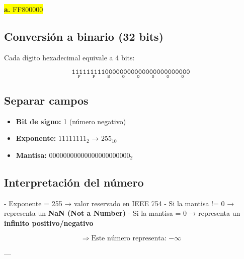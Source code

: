 \documentclass[a4paper,12pt]{article}
\begin{document}
	
	\vspace{1em}
	\begin{center}
	\colorbox{yellow}{\textbf{a.} FF800000}
	\subsection*{Conversión a binario (32 bits)}
	Cada dígito hexadecimal equivale a 4 bits:
	
	\[
		\mathtt{
		\underset{\text{F}}{\boxed{\mathtt{1111}}}
		\underset{\text{F}}{\boxed{\mathtt{1111}}}
		\underset{\text{8}}{\boxed{\mathtt{1000}}}
		\underset{\text{0}}{\boxed{\mathtt{0000}}}
		\underset{\text{0}}{\boxed{\mathtt{0000}}}
		\underset{\text{0}}{\boxed{\mathtt{0000}}}
		\underset{\text{0}}{\boxed{\mathtt{0000}}}
		\underset{\text{0}}{\boxed{\mathtt{0000}}}
		}	
	\]
	
	\subsection*{Separar campos}
	
	\begin{itemize}
		\item \textbf{Bit de signo:} 1 (número negativo)
		\item \textbf{Exponente:} $11111111_2$ → $255_{10}$
		\item \textbf{Mantisa:} $00000000000000000000000_2$ 
	\end{itemize}
	
	\subsection*{Interpretación del número}
	
	- Exponente = 255 → valor reservado en IEEE 754\newline
	- Si la mantisa != 0 → representa un \textbf{NaN (Not a Number)}\newline
	- Si la mantisa = 0 → representa un \textbf{infinito positivo/negativo}
	
	\[
	\Rightarrow \text{Este número representa: } \boxed{-\infty}
	\]
	
	---
	\end{center}
	\newpage
\end{document}
